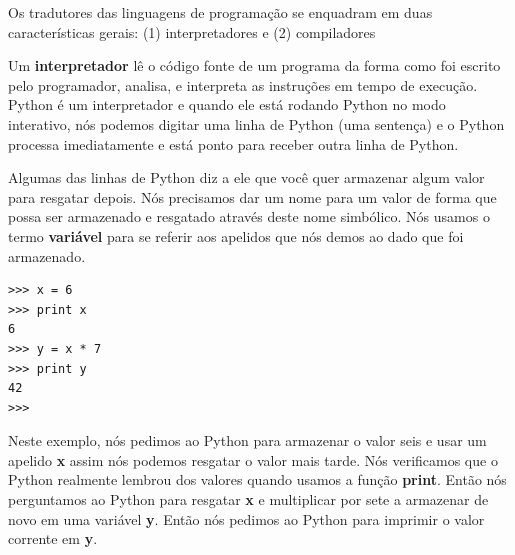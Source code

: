 Os tradutores das linguagens de programação se enquadram em duas
características gerais:
(1) interpretadores e (2) compiladores
%

Um {\bf interpretador} lê o código fonte de um programa da forma como foi escrito
pelo programador, analisa, e interpreta as instruções em tempo de
execução. Python é um interpretador e quando ele está rodando Python no modo
interativo, nós podemos digitar uma linha de Python (uma sentença) e o Python
processa imediatamente e está ponto para receber outra linha de Python.
%

Algumas das linhas de Python diz a ele que você quer armazenar algum valor
para resgatar depois. Nós precisamos dar um nome para um valor de forma que possa
ser armazenado e resgatado através deste nome simbólico. Nós usamos o termo
{\bf variável} para se referir aos apelidos que nós demos ao dado que foi armazenado.
%

\beforeverb
\begin{verbatim}
>>> x = 6
>>> print x
6
>>> y = x * 7
>>> print y
42
>>>
\end{verbatim}
\afterverb

Neste exemplo, nós pedimos ao Python para armazenar o valor seis e usar um apelido {\bf x}
assim nós podemos resgatar o valor mais tarde. Nós verificamos que o Python realmente
lembrou dos valores quando usamos a função {\bf print}. Então nós perguntamos ao Python
para resgatar {\bf x} e multiplicar por sete a armazenar de novo em uma variável {\bf y}.
Então nós pedimos ao Python para imprimir o valor corrente em {\bf y}.
%

